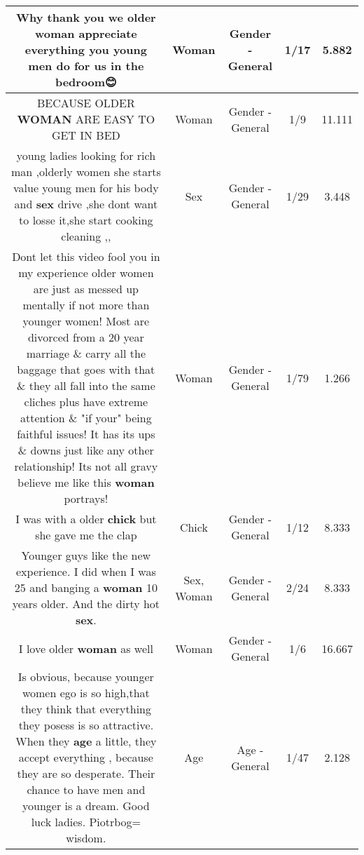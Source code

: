 \documentclass[11pt]{article}
\newlength\mylength
\begin{document}
\begin{center}
\begin{longtable}{|C{.65\mylength}|C{.30\mylength}|C{.12\mylength}|C{.12\mylength}|C{.12\mylength}|}
  \small Why thank you we older \textbf{woman} appreciate everything you young men do for us in the bedroom😊\normalsize   & Woman & Gender - General & 1/17 & 5.882 \\  \hline
  \small BECAUSE OLDER \textbf{WOMAN} ARE EASY TO GET IN BED\normalsize   & Woman & Gender - General & 1/9 & 11.111 \\  \hline
  \small young ladies looking for rich man ,olderly women she starts value young men for his body and \textbf{sex} drive ,she dont want to losse it,she start cooking cleaning ,,\normalsize   & Sex & Gender - General & 1/29 & 3.448 \\  \hline
  \small Dont let this video fool you in my experience older women are just as messed up mentally if not more than younger women! Most are divorced from a 20 year marriage \& carry all the baggage that goes with that \& they all fall into the same cliches plus have extreme attention \& "if your" being faithful issues! It has its ups \& downs just like any other relationship! Its not all gravy believe me like this \textbf{woman} portrays!\normalsize   & Woman & Gender - General & 1/79 & 1.266 \\  \hline
  \small I was with a older \textbf{chick} but she gave me the clap\normalsize   & Chick & Gender - General & 1/12 & 8.333 \\  \hline
  \small Younger guys like the new experience. I did when I was 25 and banging a \textbf{woman} 10 years older. And the dirty hot \textbf{sex}.\normalsize   & Sex, Woman & Gender - General & 2/24 & 8.333 \\  \hline
  \small I love older \textbf{woman} as well\normalsize   & Woman & Gender - General & 1/6 & 16.667 \\  \hline
  \small Is obvious, because younger women ego is so high,that they think that everything they posess is so attractive. When they \textbf{age} a little, they accept everything , because they are so desperate. Their chance to have men and younger is a dream. Good luck ladies. Piotrbog= wisdom.\normalsize   & Age & Age - General & 1/47 & 2.128 \\  \hline

\end{longtable}
\end{center}
\end{document}
